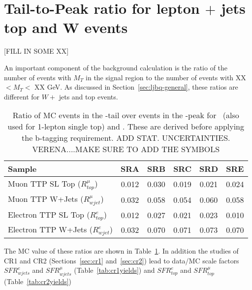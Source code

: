\section{Tail-to-Peak ratio for lepton $+$ jets top and W events}
\label{sec:ttp}

[FILL IN SOME XX]


An important component
of the background calculation is the ratio of the number of events with $M_T$ in the signal region
to the number of events with XX $< M_T <$ XX GeV.  
As discussed in Section~\ref{sec:ljbq-general}, these ratios are different for $W +$ jets and 
top events.  



\begin{table}[!h]
\begin{center}
\begin{tabular}{l||c|c|c|c|c}
\hline
Sample              & SRA & SRB & SRC & SRD & SRE\\
\hline
\hline
Muon TTP SL Top ($R^{\mu}_{top}$)	  & 0.012  & 0.030  & 0.019  & 0.021  & 0.024  \\
Muon TTP W+Jets  ($R^{\mu}_{wjet}$)	  & 0.032  & 0.058  & 0.054  & 0.060  & 0.058  \\
\hline
\hline
Electron TTP SL Top  ($R^e_{top}$)	  & 0.012  & 0.027  & 0.021  & 0.023  & 0.010  \\
Electron TTP W+Jets  ($R^e_{wjet}$)	  & 0.032  & 0.070  & 0.071  & 0.073  & 0.070  \\
\hline
\hline
\end{tabular}
\caption{ Ratio of MC events in the \mt-tail over events in the \mt-peak for
  \ttsl\ (also used for 1-lepton single top) and \wjets. These are
  derived before applying the b-tagging requirement.  
  ADD STAT. UNCERTAINTIES.  VERENA....MAKE SURE TO ADD THE SYMBOLS
\label{tab:ttp}}
\end{center}
\end{table}

The MC value of these ratios are shown in Table~\ref{tab:ttp}.
In addition the studies of CR1 and CR2 (Sections~\ref{sec:cr1} and~\ref{sec:cr2})
lead to data/MC scale factors 
$SFR^{e}_{wjets}$ and  $SFR^{\mu}_{wjets}$ (Table~\ref{tab:cr1yields}) and
$SFR^{e}_{top}$ and  $SFR^{\mu}_{top}$ (Table~\ref{tab:cr2yields})

\clearpage